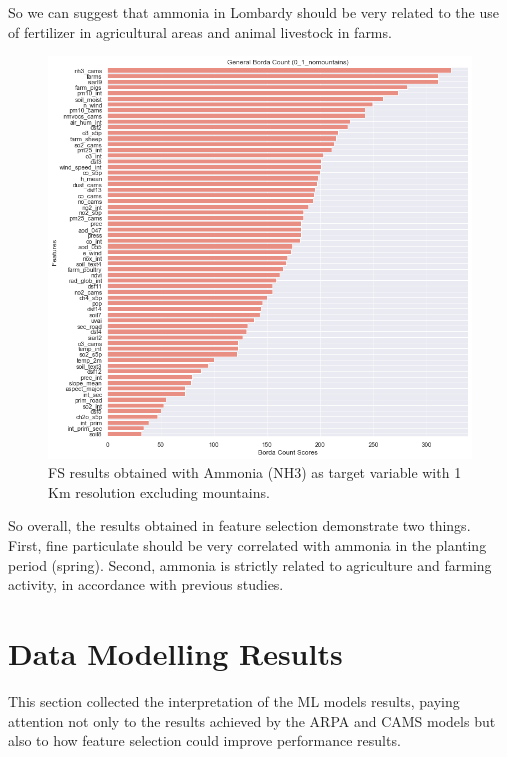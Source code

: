 So we can suggest that ammonia in Lombardy should be very related to the use of fertilizer in agricultural areas and animal livestock in farms.
\bigbreak
\pagebreak
\clearpage
\begin{figure}[H]
\centering
\includegraphics[scale =0.50]{images/tests/0_1_nomountainsnh3_st.png}
\caption{FS results obtained with Ammonia (NH3) as target variable with 1 Km resolution excluding mountains.}
\label{fig:fs_nh3}
\end{figure}
So overall, the results obtained in feature selection demonstrate two things.\\
First, fine particulate should be very correlated with ammonia in the planting period (spring). Second, ammonia is strictly related to agriculture and farming activity, in accordance with previous studies.\pagebreak
\section{Data Modelling Results}
This section collected the interpretation of the ML models results, paying attention not only to the results achieved by the ARPA and CAMS models but also to how feature selection could improve performance results. 
